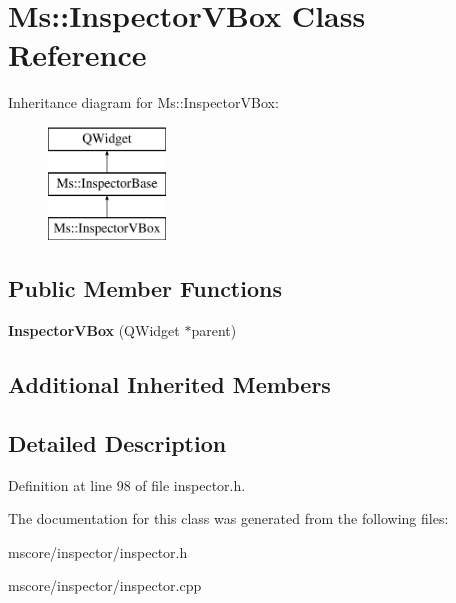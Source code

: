 \hypertarget{class_ms_1_1_inspector_v_box}{}\section{Ms\+:\+:Inspector\+V\+Box Class Reference}
\label{class_ms_1_1_inspector_v_box}
Inheritance diagram for Ms\+:\+:Inspector\+V\+Box\+:\begin{figure}[H]
\begin{center}
\leavevmode
\includegraphics[height=3.000000cm]{class_ms_1_1_inspector_v_box}
\end{center}
\end{figure}
\subsection*{Public Member Functions}
\begin{DoxyCompactItemize}
\item 
\mbox{\label{class_ms_1_1_inspector_v_box_a89c59a1172df7f2fe4085918930e67d2}} 
{\bfseries Inspector\+V\+Box} (Q\+Widget $\ast$parent)
\end{DoxyCompactItemize}
\subsection*{Additional Inherited Members}


\subsection{Detailed Description}


Definition at line 98 of file inspector.\+h.



The documentation for this class was generated from the following files\+:\begin{DoxyCompactItemize}
\item 
mscore/inspector/inspector.\+h\item 
mscore/inspector/inspector.\+cpp\end{DoxyCompactItemize}
